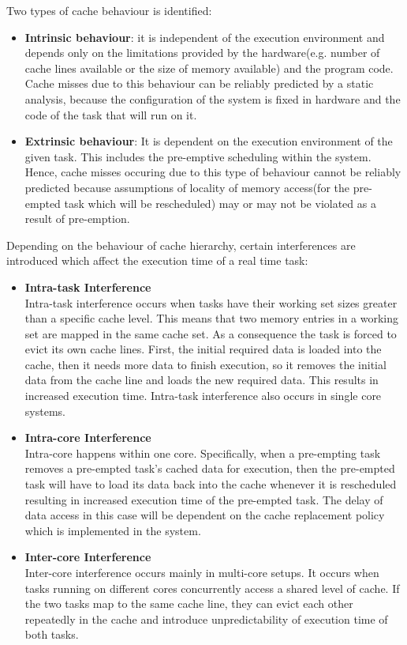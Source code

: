 \documentclass[conference]{IEEEtran}
\begin{document}
    Two types of cache behaviour is identified\cite{b7}:
    \begin{itemize}
        \item \textbf{Intrinsic behaviour}: it is independent of the execution environment and depends only on the limitations provided by the hardware(e.g. number of cache lines available or the size of memory available) and the program code. Cache misses due to this behaviour can be reliably predicted by a static analysis, because the configuration of the system is fixed in hardware and the code of the task that will run on it.
        \item \textbf{Extrinsic behaviour}: It is dependent on the execution environment of the given task. This includes the pre-emptive scheduling within the system. Hence, cache misses occuring due to this type of behaviour cannot be reliably predicted because assumptions of locality of memory access(for the pre-empted task which will be rescheduled) may or may not be violated as a result of pre-emption.
    \end{itemize}
    Depending on the behaviour of cache hierarchy, certain interferences are introduced which affect the execution time of a real time task:
    \begin{itemize}
        \item  \textbf{Intra-task Interference}\\
        Intra-task interference occurs when tasks have their working set sizes greater than a specific cache level. This means that two memory entries in a working set are mapped in the same cache set. As a consequence the task is forced to evict its own cache lines. First, the initial required data is loaded into the cache, then it needs more data to finish execution, so it removes the initial data from the cache line and loads the new required data. This results in increased execution time. Intra-task interference also occurs in single core systems.
        \item \textbf{Intra-core Interference}\\
         Intra-core happens within one core. Specifically, when a pre-empting task removes a pre-empted task's cached data for execution, then the pre-empted task will have to load its data back into the cache whenever it is rescheduled resulting in increased execution time of the pre-empted task. The delay of data access in this case will be dependent on the cache replacement policy which is implemented in the system.
         \item \textbf{Inter-core Interference}\\
         Inter-core interference occurs mainly in multi-core setups. It occurs when tasks running on different cores concurrently access a shared level of cache. If the two tasks map to the same cache line, they can evict each other repeatedly in the cache and introduce unpredictability of execution time of both tasks.\\
    \end{itemize}
 
\end{document}
